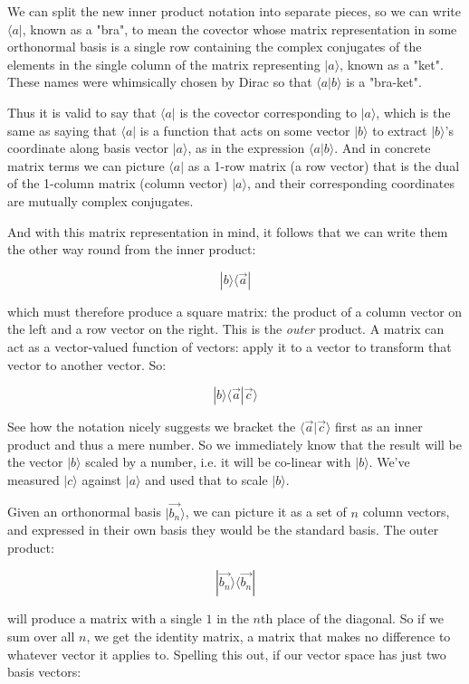 We can split the new inner product notation into separate pieces, so we can write $\langle a|$, known as a "bra", to mean the covector whose matrix representation in some orthonormal basis is a single row containing the complex conjugates of the elements in the single column of the matrix representing $|a \rangle$, known as a "ket". These names were whimsically chosen by Dirac so that $\langle a|b \rangle$ is a "bra-ket".

Thus it is valid to say that $\langle a|$ is the covector corresponding to $|a \rangle$, which is the same as saying that $\langle a|$ is a function that acts on some vector $|b \rangle$ to extract $|b \rangle$'s coordinate along basis vector $|a \rangle$, as in the expression $\langle a|b \rangle$. And in concrete matrix terms we can picture $\langle a|$ as a 1-row matrix (a row vector) that is the dual of the 1-column matrix (column vector) $|a \rangle$, and their corresponding coordinates are mutually complex conjugates.

And with this matrix representation in mind, it follows that we can write them the other way round from the inner product:

$$|b \rangle \langle \vec{a} |$$

which must therefore produce a square matrix: the product of a column vector on the left and a row vector on the right. This is the \textit{outer} product. A matrix can act as a vector-valued function of vectors: apply it to a vector to transform that vector to another vector. So:

$$|b \rangle \langle \vec{a} | \vec{c} \rangle$$

See how the notation nicely suggests we bracket the $\langle \vec{a} | \vec{c} \rangle$ first as an inner product and thus a mere number. So we immediately know that the result will be the vector $|b \rangle$ scaled by a number, i.e. it will be co-linear with $|b \rangle$. We've measured $|c \rangle$ against $|a \rangle$ and used that to scale $|b \rangle$.

Given an orthonormal basis $|\vec{b_n} \rangle$, we can picture it as a set of $n$ column vectors, and expressed in their own basis they would be the standard basis. The outer product:

$$|\vec{b_n} \rangle \langle \vec{b_n} |$$

will produce a matrix with a single $1$ in the $n$th place of the diagonal. So if we sum over all $n$, we get the identity matrix, a matrix that makes no difference to whatever vector it applies to. Spelling this out, if our vector space has just two basis vectors:

